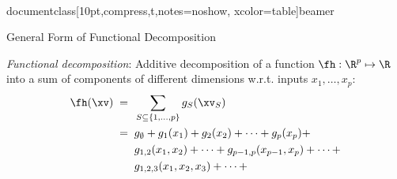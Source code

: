 \\documentclass[10pt,compress,t,notes=noshow, xcolor=table]{beamer}
\newcommand{\open}{}
\newcommand{\close}{}
\begin{document}
\begin{frame}{General Form of Functional Decomposition
}


\begin{definition}
\textit{Functional decomposition}: Additive decomposition of a function $\fh: \R^p \mapsto \R$ into a sum of components of different dimensions w.r.t. inputs $x_1, \ldots, x_p$: 
\begin{equation*}
\begin{split}
\fh(\xv)
\; = \; \; & \sum_{S \subseteq \{1,\ldots,p\}} g_{S}(\xv_S) \\
\; = \; \; & g_{\open \emptyset \close} +
g_{\open 1 \close}(x_1) + g_{\open 2 \close}(x_2) + \dots + g_{\open p \close}(x_p) + \\
& g_{\open 1, 2 \close}(x_1, x_2) + \dots + g_{\open p-1, p \close}(x_{p-1}, x_p) + \dots + \\
& g_{\open 1, 2, 3 \close}(x_1, x_2, x_3) + \dots +

\end{split}
\end{equation*}
\end{definition}
\end{frame}
\end{document}

